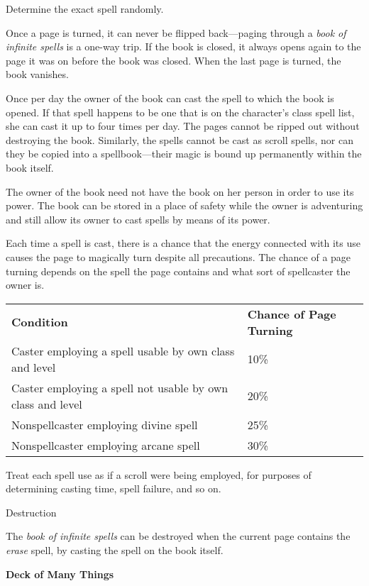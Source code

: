 				
Determine the exact spell randomly.
				
Once a page is turned, it can never be flipped back---paging through a \textit{book of infinite spells }is a one-way trip. If the book is closed, it always opens again to the page it was on before the book was closed. When the last page is turned, the book vanishes.
				
Once per day the owner of the book can cast the spell to which the book is opened. If that spell happens to be one that is on the character's class spell list, she can cast it up to four times per day. The pages cannot be ripped out without destroying the book. Similarly, the spells cannot be cast as scroll spells, nor can they be copied into a spellbook---their magic is bound up permanently within the book itself.
				
The owner of the book need not have the book on her person in order to use its power. The book can be stored in a place of safety while the owner is adventuring and still allow its owner to cast spells by means of its power.
				
Each time a spell is cast, there is a chance that the energy connected with its use causes the page to magically turn despite all precautions. The chance of a page turning depends on the spell the page contains and what sort of spellcaster the owner is.

\begin{tabular}{ll}
\textbf{Condition} & \textbf{Chance of Page Turning} \\
Caster employing a spell usable by own class and level & 10\% \\
Caster employing a spell not usable by own class and level & 20\% \\
Nonspellcaster employing divine spell & 25\% \\
Nonspellcaster employing arcane spell & 30\% \\
\end{tabular}

				
Treat each spell use as if a scroll were being employed, for purposes of determining casting time, spell failure, and so on. 
				
Destruction
				
The \textit{book of infinite spells }can be destroyed when the current page contains the \textit{erase }spell, by casting the spell on the book itself.
				
\textbf{Deck of Many Things}
				
